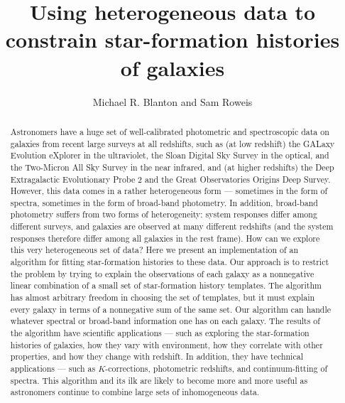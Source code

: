 \documentclass[10pt]{aastex}
\newcounter{address}
\begin{document}
\title{ Using heterogeneous data to constrain star-formation histories
of galaxies}

\author{
Michael R. Blanton\altaffilmark{\ref{NYU}} and 
Sam Roweis\altaffilmark{\ref{NYU}}}

\setcounter{address}{1}
\clearpage

\begin{abstract}
Astronomers have a huge set of well-calibrated photometric and
spectroscopic data on galaxies from recent large surveys at all
redshifts, such as (at low redshift) the GALaxy Evolution eXplorer in
the ultraviolet, the Sloan Digital Sky Survey in the optical, and the
Two-Micron All Sky Survey in the near infrared, and (at higher
redshifts) the Deep Extragalactic Evolutionary Probe 2 and the Great
Observatories Origins Deep Survey.  However, this data comes in a
rather heterogeneous form --- sometimes in the form of spectra,
sometimes in the form of broad-band photometry. In addition,
broad-band photometry suffers from two forms of heterogeneity: system
responses differ among different surveys, and galaxies are observed at
many different redshifts (and the system responses therefore differ
among all galaxies in the rest frame).  How can we explore this very
heterogeneous set of data?  Here we present an implementation of an
algorithm for fitting star-formation histories to these data. Our
approach is to restrict the problem by trying to explain the
observations of each galaxy as a nonnegative linear combination of a
small set of star-formation history templates.  The algorithm has
almost arbitrary freedom in choosing the set of templates, but it must
explain every galaxy in terms of a nonnegative sum of the same set.
Our algorithm can handle whatever spectral or broad-band information
one has on each galaxy.  The results of the algorithm have scientific
applications --- such as exploring the star-formation histories of
galaxies, how they vary with environment, how they correlate with
other properties, and how they change with redshift. In addition, they
have technical applications --- such as $K$-corrections, photometric
redshifts, and continuum-fitting of spectra. This algorithm and its
ilk are likely to become more and more useful as astronomers continue
to combine large sets of inhomogeneous data.
\end{abstract}

\end{document}
